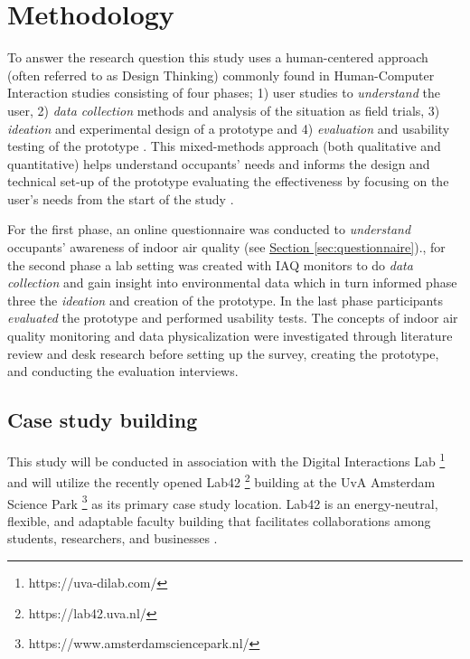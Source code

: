 \section{Methodology}
\label{sec:methodology}

To answer the research question this study uses a human-centered approach (often referred to as Design Thinking) commonly found in Human-Computer Interaction studies consisting of four phases; 1) user studies to \textit{understand} the user, 2) \textit{data collection} methods and analysis of the situation as field trials, 3) \textit{ideation} and experimental design of a prototype and 4) \textit{evaluation} and usability testing of the prototype \cite{jonathan_lazar_research_2017, zimmerman_research_2007}. This mixed-methods approach (both qualitative and quantitative)  helps understand occupants' needs and informs the design and technical set-up of the prototype evaluating the effectiveness by focusing on the user's needs from the start of the study \cite{rogers_moving_2017, experience_ux_2024}. 

For the first phase, an online questionnaire was conducted to \textit{understand} occupants' awareness of indoor air quality (see \hyperref[sec:questionnaire]{Section \ref*{sec:questionnaire}})., for the second phase a lab setting was created with IAQ monitors to do \textit{data collection} and gain insight into environmental data which in turn informed phase three the \textit{ideation} and creation of the prototype. In the last phase participants \textit{evaluated} the prototype and performed usability tests. The concepts of indoor air quality monitoring and data physicalization were investigated through literature review and desk research before setting up the survey, creating the prototype, and conducting the evaluation interviews.

\subsection{Case study building}

This study will be conducted in association with the Digital Interactions Lab \footnote{https://uva-dilab.com/} and will utilize the recently opened Lab42 \footnote{https://lab42.uva.nl/} building at the UvA Amsterdam Science Park \footnote{https://www.amsterdamsciencepark.nl/} as its primary case study location. Lab42 is an energy-neutral, flexible, and adaptable faculty building that facilitates collaborations among students, researchers, and businesses \cite{benthem_2022}. 

